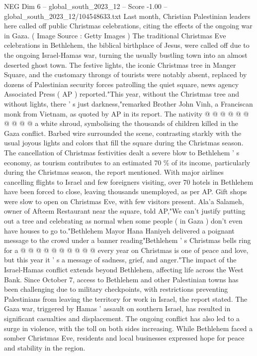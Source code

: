 \begin{textsample}{NEG Dim 6 – global\_south\_2023\_12 – Score -1.00 – global\_south\_2023\_12/104548633.txt}
Last month, Christian Palestinian leaders here called off public Christmas celebrations, citing the effects of the ongoing war in Gaza. ( Image Source : Getty Images ) The traditional Christmas Eve celebrations in Bethlehem, the biblical birthplace of Jesus, were called off due to the ongoing Israel-Hamas war, turning the usually bustling town into an almost deserted ghost town.
The festive lights, the iconic Christmas tree in Manger Square, and the customary throngs of tourists were notably absent, replaced by dozens of Palestinian security forces patrolling the quiet square, news agency Associated Press ( AP ) reported."This year, without the Christmas tree and without lights, there ' s just darkness,"remarked Brother John Vinh, a Franciscan monk from Vietnam, as quoted by AP in its report.
The nativity @ @ @ @ @ @ @ @ @ @ a white shroud, symbolising the thousands of children killed in the Gaza conflict.
Barbed wire surrounded the scene, contrasting starkly with the usual joyous lights and colors that fill the square during the Christmas season.
The cancellation of Christmas festivities dealt a severe blow to Bethlehem ' s economy, as tourism contributes to an estimated 70 \% of its income, particularly during the Christmas season, the report mentioned.
With major airlines cancelling flights to Israel and few foreigners visiting, over 70 hotels in Bethlehem have been forced to close, leaving thousands unemployed, as per AP.
Gift shops were slow to open on Christmas Eve, with few visitors present.
Ala'a Salameh, owner of Afteem Restaurant near the square, told AP,"We can't justify putting out a tree and celebrating as normal when some people ( in Gaza ) don't even have houses to go to."Bethlehem Mayor Hana Haniyeh delivered a poignant message to the crowd under a banner reading"Bethlehem ' s Christmas bells ring for a @ @ @ @ @ @ @ @ @ @ every year on Christmas is one of peace and love, but this year it ' s a message of sadness, grief, and anger."The impact of the Israel-Hamas conflict extends beyond Bethlehem, affecting life across the West Bank.
Since October 7, access to Bethlehem and other Palestinian towns has been challenging due to military checkpoints, with restrictions preventing Palestinians from leaving the territory for work in Israel, the report stated.
The Gaza war, triggered by Hamas ' assault on southern Israel, has resulted in significant casualties and displacement.
The ongoing conflict has also led to a surge in violence, with the toll on both sides increasing.
While Bethlehem faced a somber Christmas Eve, residents and local businesses expressed hope for peace and stability in the region.

\end{textsample}

